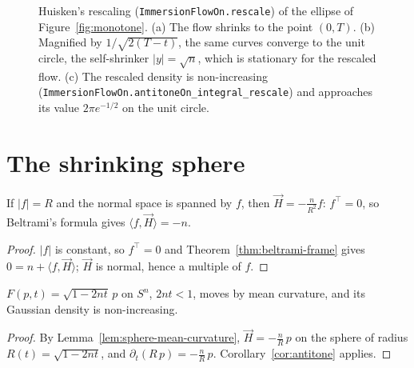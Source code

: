 \begin{figure}[htbp]
\centering
{}
\caption{Huisken's rescaling (\texttt{ImmersionFlowOn.rescale}) of the ellipse of
Figure~\ref{fig:monotone}. (a) The flow shrinks to the point $(0, T)$. (b) Magnified by
$1/\sqrt{2(T - t)}$, the same curves converge to the unit circle, the self-shrinker
$|y| = \sqrt n$, which is stationary for the rescaled flow. (c) The rescaled density is
non-increasing (\texttt{ImmersionFlowOn.antitoneOn\_integral\_rescale}) and approaches its
value $2\pi e^{-1/2}$ on the unit circle.}
\label{fig:rescaled}
\end{figure}

\section{The shrinking sphere}

\begin{lemma}
  \label{lem:sphere-mean-curvature}
  \leanok
  If $|f| = R$ and the normal space is spanned by $f$, then $\vec H = -\frac{n}{R^2} f$:
  $f^\top = 0$, so Beltrami's formula gives $\langle f, \vec H\rangle = -n$.
\end{lemma}

\begin{proof}
  \leanok
  $|f|$ is constant, so $f^\top = 0$ and Theorem~\ref{thm:beltrami-frame} gives $0 = n + \langle f, \vec H\rangle$; $\vec H$ is normal, hence a multiple of $f$.
\end{proof}

\begin{theorem}
  \label{thm:shrinking-sphere}
  \leanok
  $F(p, t) = \sqrt{1 - 2nt}\,p$ on $S^n$, $2nt < 1$, moves by mean curvature, and its
  Gaussian density is non-increasing.
\end{theorem}

\begin{proof}
  \leanok
  By Lemma~\ref{lem:sphere-mean-curvature}, $\vec H = -\frac{n}{R}\,p$ on the sphere of radius $R(t) = \sqrt{1 - 2nt}$, and $\partial_t(R\,p) = -\frac{n}{R}\,p$. Corollary~\ref{cor:antitone} applies.
\end{proof}

